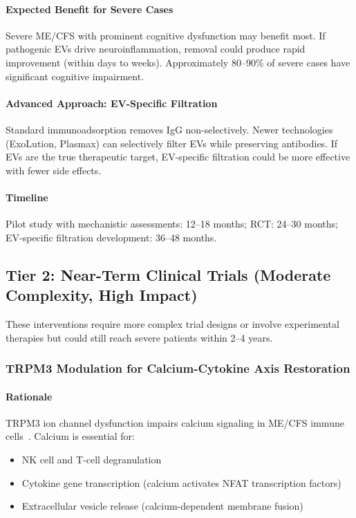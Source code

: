 \paragraph{Expected Benefit for Severe Cases}
Severe ME/CFS with prominent cognitive dysfunction may benefit most. If pathogenic EVs drive neuroinflammation, removal could produce rapid improvement (within days to weeks). Approximately 80--90\% of severe cases have significant cognitive impairment.

\paragraph{Advanced Approach: EV-Specific Filtration}
Standard immunoadsorption removes IgG non-selectively. Newer technologies (ExoLution, Plasmax) can selectively filter EVs while preserving antibodies. If EVs are the true therapeutic target, EV-specific filtration could be more effective with fewer side effects.

\paragraph{Timeline}
Pilot study with mechanistic assessments: 12--18 months; RCT: 24--30 months; EV-specific filtration development: 36--48 months.

\subsection{Tier 2: Near-Term Clinical Trials (Moderate Complexity, High Impact)}
\label{sec:tier2-research}

These interventions require more complex trial designs or involve experimental therapies but could still reach severe patients within 2--4 years.

\subsubsection{TRPM3 Modulation for Calcium-Cytokine Axis Restoration}

\paragraph{Rationale}
TRPM3 ion channel dysfunction impairs calcium signaling in ME/CFS immune cells~\cite{Sasso2026trpm3}. Calcium is essential for:
\begin{itemize}
    \item NK cell and T-cell degranulation
    \item Cytokine gene transcription (calcium activates NFAT transcription factors)
    \item Extracellular vesicle release (calcium-dependent membrane fusion)
\end{itemize}

